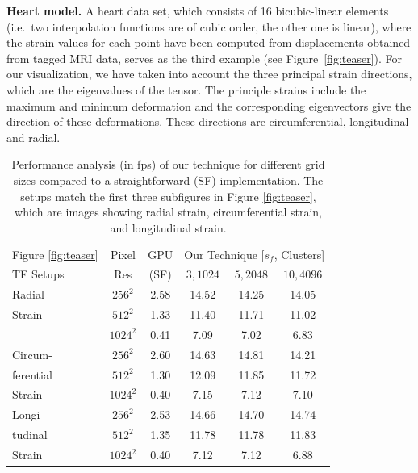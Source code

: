 \documentclass[journal]{vgtc}                %
\begin{document}
\noindent \textbf{Heart model.} A heart data set, which consists of 16 bicubic-linear elements (i.e.~two interpolation functions are of cubic order, the other one is linear),  where the strain values for each point have been computed from displacements  obtained from tagged MRI data, serves as the third example (see Figure~\ref{fig:teaser}). For our visualization, we have taken into account the three principal strain directions, which are the eigenvalues of the tensor. The principle strains include the maximum and minimum deformation and the corresponding eigenvectors give the direction of these deformations. These directions are circumferential, longitudinal and radial.
%
\begin{table}[b]
  \caption{Performance analysis (in fps) of our technique for different grid sizes compared to a straightforward (SF) implementation. The setups match the first three subfigures in Figure \ref{fig:teaser}, which are images showing radial strain, circumferential strain, and longitudinal strain.}
  \label{tab:performance}
  \begin{center}
    \begin{tabular}{|l|c|c|c|c|c|}
      \hline
      Figure \ref{fig:teaser} & Pixel & GPU & \multicolumn{3}{c|}{Our Technique [$s_f$, Clusters]}\\
      TF Setups & Res & (SF) & $3,1024$ & $5,2048$ & $10,4096$ \\
      \hline
      Radial & $256^2$ & 2.58 & 14.52 & 14.25 & 14.05\\
      Strain & $512^2$ & 1.33 & 11.40 & 11.71 & 11.02\\
      & $1024^2$ & 0.41 & 7.09 & 7.02 & 6.83\\
      \hline
      Circum- & $256^2$ & 2.60 & 14.63 & 14.81 & 14.21\\
      ferential & $512^2$ & 1.30 & 12.09 & 11.85 & 11.72\\
      Strain & $1024^2$ & 0.40 & 7.15 & 7.12 & 7.10\\
      \hline
      Longi- & $256^2$ & 2.53 & 14.66 & 14.70 & 14.74\\
      tudinal & $512^2$ & 1.35 & 11.78 & 11.78 & 11.83\\
      Strain & $1024^2$ & 0.40 & 7.12 & 7.12 & 6.88\\
      \hline
    \end{tabular}
  \end{center}
\end{table}
%
\end{document}
